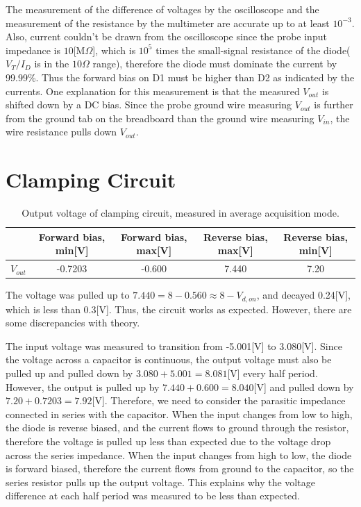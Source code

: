 \documentclass[a4paper, itemph]{oblivoir}
\theoremstyle{definition}
\begin{document}
The measurement of the difference of voltages by the oscilloscope and the measurement of the resistance by the multimeter are accurate up to at least $10^{-3}$. Also, current couldn't be drawn from the oscilloscope since the probe input impedance is $10$[M$\Omega$], which is $10^5$ times the small-signal resistance of the diode($V_T/I_D$ is in the $10\Omega$ range), therefore the diode must dominate the current by 99.99\%. Thus the forward bias on D1 must be higher than D2 as indicated by the currents. One explanation for this measurement is that the measured $V_{out}$ is shifted down by a DC bias. Since the probe ground wire measuring $V_{out}$ is further from the ground tab on the breadboard than the ground wire measuring $V_{in}$, the wire resistance pulls down $V_{out}$.
\section{Clamping Circuit}
\begin{table}[htb]
    \centering
    \begin{tabular}{c|c|c|c|c}
         & Forward bias, min[V] & Forward bias, max[V] & Reverse bias, max[V] & Reverse bias, min[V]\\
         \hline
         $V_{out}$& -0.7203 & -0.600 & 7.440 & 7.20
    \end{tabular}
    \caption{Output voltage of clamping circuit, measured in average acquisition mode.}
\end{table}
The voltage was pulled up to $7.440=8-0.560\approx 8-V_{d,on}$, and decayed 0.24[V], which is less than 0.3[V]. Thus, the circuit works as expected. However, there are some discrepancies with theory.

The input voltage was measured to transition from -5.001[V] to 3.080[V]. Since the voltage across a capacitor is continuous, the output voltage must also be pulled up and pulled down by $3.080+5.001=8.081$[V] every half period. However, the output is pulled up by $7.440+0.600=8.040$[V] and pulled down by $7.20+0.7203=7.92$[V]. Therefore, we need to consider the parasitic impedance connected in series with the capacitor. When the input changes from low to high, the diode is reverse biased, and the current flows to ground through the resistor, therefore the voltage is pulled up less than expected due to the voltage drop across the series impedance. When the input changes from high to low, the diode is forward biased, therefore the current flows from ground to the capacitor, so the series resistor pulls up the output voltage. This explains why the voltage difference at each half period was measured to be less than expected. 
\end{document}
